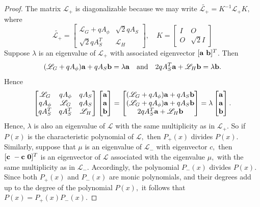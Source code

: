 \documentclass[10pt,a4paper]{amsart}
\def \a {{\bf a}}
\def \b {{\bf b}}
\def \c {{\bf c}}
\def \o {{\bf 0}}
\begin{document}
 \begin{proof}
The matrix $\mathscr{L}_+$ is diagonalizable because we may write $\widetilde{\mathscr{L}_+}= K^{-1}\mathscr{L}_+ K,$ where
\begin{equation}
\label{L+}
\widetilde{\mathscr{L}_+}=\begin{bmatrix}
		\mathscr{L}_G+qA_\phi&\sqrt{2}q A_S\\
		\sqrt{2}qA_S^T & \mathscr{L}_H
\end{bmatrix}, \quad K=\begin{bmatrix}
		I& O\\
		O & \sqrt{2}I
	\end{bmatrix}
\end{equation}
Suppose $\lambda$ is an eigenvalue of $\mathscr{L}_+$ with associated eigenvector $[\a~ \b]^T$. Then 
\begin{equation*}
(\mathscr{L}_G+qA_\phi)\a+qA_S\b=\lambda \a\quad \text{and} \quad 2qA_S^T\a+\mathscr{L}_H\b=\lambda \b.
\end{equation*}
Hence
$$\begin{bmatrix}
		\mathscr{L}_G& qA_\phi& qA_S\\
		qA_\phi &\mathscr{L}_G &qA_S\\
		qA_S^T & qA_S^T & \mathscr{L}_H  
\end{bmatrix}\begin{bmatrix}
		\a\\ \a\\ \b
	\end{bmatrix}=\begin{bmatrix}
		(\mathscr{L}_G+qA_\phi)\a+qA_S \b\\
		(\mathscr{L}_G+qA_\phi)\a+qA_S \b\\
		2qA_S^T \a+\mathscr{L}_H\b
	\end{bmatrix}=\lambda \begin{bmatrix}
		\a\\ \a\\ \b  
	\end{bmatrix}.$$  
Hence, $\lambda$ is also an eigenvalue of $\mathscr{L}$ with the same multiplicity as in $\mathscr{L}_+$. So if $P(x)$ is the characteristic polynomial of $\mathscr{L},$ then $P_+(x)$ divides $P(x).$ Similarly, suppose that $\mu$ is an eigenvalue of $\mathscr{L}_{-}$ with eigenvector $c,$ then $[\c~ -\c~ \o]^T$ is an eigenvector of $\mathscr{L}$ associated with the eigenvalue $\mu,$ with the same multiplicity as in $\mathscr{L}_{-}$. Accordingly, the polynomial $P_-(x)$ divides $P(x).$ Since both $P_+(x)$ and $P_-(x)$ are monic polynomials, and their degrees add up to the degree of the polynomial $P(x),$ it follows that $P(x)= P_+(x) P_-(x).$
\end{proof}
\end{document}
